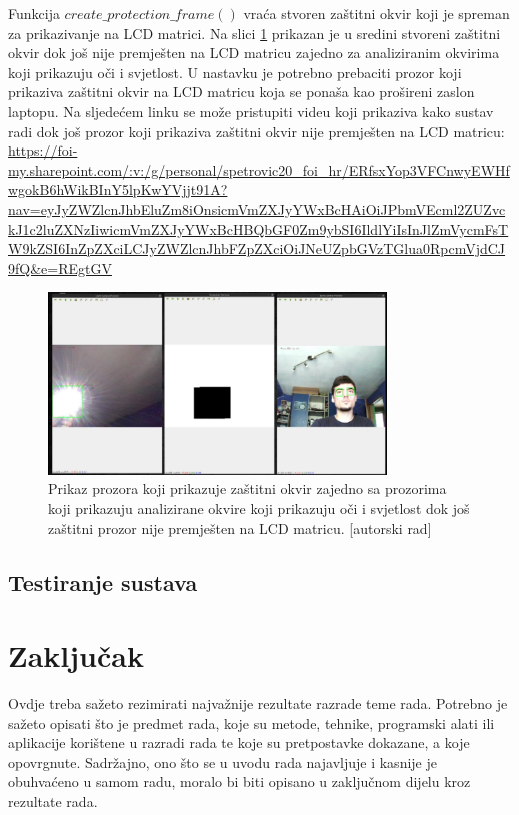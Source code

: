 \documentclass{foi}
\begin{document}
Funkcija $create\_protection\_frame()$ vraća stvoren zaštitni okvir koji je spreman za prikazivanje na LCD matrici. Na slici \ref{fig:zastitni_okvir} prikazan je u sredini stvoreni zaštitni okvir dok još nije premješten na LCD matricu zajedno za analiziranim okvirima koji prikazuju oči i svjetlost. U nastavku je potrebno prebaciti prozor koji prikaziva zaštitni okvir na LCD matricu koja se ponaša kao prošireni zaslon laptopu. Na sljedećem linku se može pristupiti videu koji prikaziva kako sustav radi dok još prozor koji prikaziva zaštitni okvir nije premješten na LCD matricu: \url{https://foi-my.sharepoint.com/:v:/g/personal/spetrovic20_foi_hr/ERfsxYop3VFCnwyEWHfwgokB6hWikBInY5lpKwYVjjt91A?nav=eyJyZWZlcnJhbEluZm8iOnsicmVmZXJyYWxBcHAiOiJPbmVEcml2ZUZvckJ1c2luZXNzIiwicmVmZXJyYWxBcHBQbGF0Zm9ybSI6IldlYiIsInJlZmVycmFsTW9kZSI6InZpZXciLCJyZWZlcnJhbFZpZXciOiJNeUZpbGVzTGlua0RpcmVjdCJ9fQ&e=REgtGV}

\begin{figure}[h!]
    \centering
    \includegraphics[width=0.8\textwidth]{slike/zastitni_okvir}
    \caption{Prikaz prozora koji prikazuje zaštitni okvir zajedno sa prozorima koji prikazuju analizirane okvire koji prikazuju oči i svjetlost dok još zaštitni prozor nije premješten na LCD matricu. [autorski rad]}
    \label{fig:zastitni_okvir}
\end{figure}

\section{Testiranje sustava}

\pagebreak
\chapter{Zaključak}

Ovdje treba sažeto rezimirati najvažnije rezultate razrade teme rada. Potrebno je sažeto opisati što je predmet rada, koje su metode, tehnike, programski alati ili aplikacije korištene u razradi rada te koje su pretpostavke dokazane, a koje opovrgnute. Sadržajno, ono što se u uvodu rada najavljuje i kasnije je obuhvaćeno u samom radu, moralo bi biti opisano u zaključnom dijelu kroz rezultate rada.

\printbibliography[title=Popis literature]

\listoffigures
{}

\lstlistoflistings
{}
\end{document}
